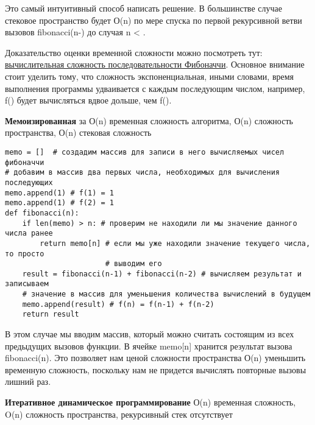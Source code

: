 \vspace{\baselineskip}
Это самый интуитивный способ написать решение. В большинстве случае стековое пространство будет О(n) по мере спуска по первой рекурсивной ветви вызовов fibonacci(n-) до случая n < .

\vspace{\baselineskip}
Доказательство оценки временной сложности можно посмотреть тут: \newline\href{https://stackoverflow.com/questions/360748/computational-complexity-of-fibonacci-sequence}{\underline{вычислительная сложность последовательности Фибоначчи}}. Основное внимание стоит уделить тому, что сложность экспоненциальная, иными словами, время выполнения программы удваивается с каждым последующим числом, например, f() будет вычисляться вдвое дольше, чем f(). 

\vspace{\baselineskip}
\textbf{Мемоизированная} за О(n) временная сложность алгоритма, О(n) сложность пространства, О(n) стековая сложность

\vspace{\baselineskip}
\begin{tcolorbox}
\begin{verbatim}
memo = []  # создадим массив для записи в него вычисляемых чисел фибоначчи
# добавим в массив два первых числа, необходимых для вычисления последующих
memo.append(1) # f(1) = 1
memo.append(1) # f(2) = 1
def fibonacci(n):
	if len(memo) > n: # проверим не находили ли мы значение данного числа ранее
		return memo[n] # если мы уже находили значение текущего числа, то просто 
					   # выводим его
	result = fibonacci(n-1) + fibonacci(n-2) # вычисляем результат и записываем 
	# значение в массив для уменьшения количества вычислений в будущем
	memo.append(result) # f(n) = f(n-1) + f(n-2)
	return result
\end{verbatim}
\end{tcolorbox}

\vspace{\baselineskip}
В этом случае мы вводим массив, который можно считать состоящим из всех предыдущих вызовов функции. В ячейке memo[n] хранится результат вызова fibonacci(n). Это позволяет нам ценой сложности пространства О(n) уменьшить временную сложность, поскольку нам не придется вычислять повторные вызовы лишний раз.

\vspace{\baselineskip}
\textbf{Итеративное динамическое программирование} О(n) временная сложность, O(n) сложность пространства, рекурсивный стек отсутствует

